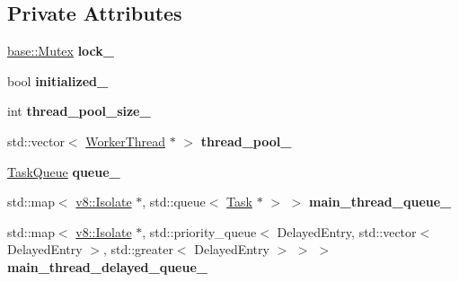 \subsection*{Private Attributes}
\begin{DoxyCompactItemize}
\item 
\hyperlink{classv8_1_1base_1_1_mutex}{base\+::\+Mutex} {\bfseries lock\+\_\+}\hypertarget{classv8_1_1platform_1_1_default_platform_a267a28a0503581072c2cf7495a95b03e}{}\label{classv8_1_1platform_1_1_default_platform_a267a28a0503581072c2cf7495a95b03e}

\item 
bool {\bfseries initialized\+\_\+}\hypertarget{classv8_1_1platform_1_1_default_platform_abaa58596f2fa8817bf40522292536db6}{}\label{classv8_1_1platform_1_1_default_platform_abaa58596f2fa8817bf40522292536db6}

\item 
int {\bfseries thread\+\_\+pool\+\_\+size\+\_\+}\hypertarget{classv8_1_1platform_1_1_default_platform_ae39c20e5c36721485f4f32a36f854040}{}\label{classv8_1_1platform_1_1_default_platform_ae39c20e5c36721485f4f32a36f854040}

\item 
std\+::vector$<$ \hyperlink{classv8_1_1platform_1_1_worker_thread}{Worker\+Thread} $\ast$ $>$ {\bfseries thread\+\_\+pool\+\_\+}\hypertarget{classv8_1_1platform_1_1_default_platform_a163a06e2dee0501bd614cb2ee1c1a0ce}{}\label{classv8_1_1platform_1_1_default_platform_a163a06e2dee0501bd614cb2ee1c1a0ce}

\item 
\hyperlink{classv8_1_1platform_1_1_task_queue}{Task\+Queue} {\bfseries queue\+\_\+}\hypertarget{classv8_1_1platform_1_1_default_platform_a28c0f4d23ece546343890bc9aeff8ca9}{}\label{classv8_1_1platform_1_1_default_platform_a28c0f4d23ece546343890bc9aeff8ca9}

\item 
std\+::map$<$ \hyperlink{classv8_1_1_isolate}{v8\+::\+Isolate} $\ast$, std\+::queue$<$ \hyperlink{classv8_1_1_task}{Task} $\ast$ $>$ $>$ {\bfseries main\+\_\+thread\+\_\+queue\+\_\+}\hypertarget{classv8_1_1platform_1_1_default_platform_a2409cca7717da224205d44ebb6b6b699}{}\label{classv8_1_1platform_1_1_default_platform_a2409cca7717da224205d44ebb6b6b699}

\item 
std\+::map$<$ \hyperlink{classv8_1_1_isolate}{v8\+::\+Isolate} $\ast$, std\+::priority\+\_\+queue$<$ Delayed\+Entry, std\+::vector$<$ Delayed\+Entry $>$, std\+::greater$<$ Delayed\+Entry $>$ $>$ $>$ {\bfseries main\+\_\+thread\+\_\+delayed\+\_\+queue\+\_\+}\hypertarget{classv8_1_1platform_1_1_default_platform_aa62b1c0f029971174b3111a164e0b547}{}\label{classv8_1_1platform_1_1_default_platform_aa62b1c0f029971174b3111a164e0b547}

\end{DoxyCompactItemize}
